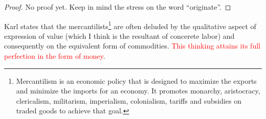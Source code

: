 \documentclass[12pt]{extarticle}
\theoremstyle{definition}
\begin{document}
  \begin{proof}
    No proof yet.  Keep in mind the stress on the word ``originate''.
  \end{proof}

  Karl states that the mercantilists\footnote{Mercantilism is an economic policy that is designed to maximize the exports and minimize the imports for an economy. It promotes monarchy, aristocracy, clericalism, militarism, imperialism, colonialism, tariffs and subsidies on traded goods to achieve that goal.} are often deluded by the qualitative aspect of expression of value (which I think is the resultant of concerete labor) and consequently on the equivalent form of commodities.  \textcolor{red}{This thinking attains its full perfection in the form of money}.

  



\end{document}
